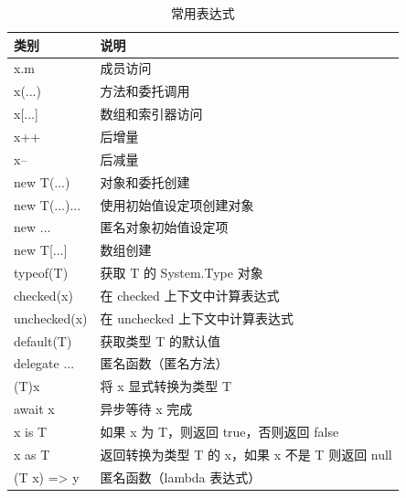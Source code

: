 \begin{table}[htbp]
    \centering
    \caption{常用表达式}
    \label{tab:expression}
    \begin{tabular}{l|l}
        \hline
        类别              & 说明                               \\
        \hline
        x.m             & 成员访问                             \\
        x(...)          & 方法和委托调用                          \\
        x[...]          & 数组和索引器访问                         \\
        x++             & 后增量                              \\
        x--             & 后减量                              \\
        new T(...)      & 对象和委托创建                          \\
        new T(...){...} & 使用初始值设定项创建对象                     \\
        new {...}       & 匿名对象初始值设定项                       \\
        new T[...]      & 数组创建                             \\
        typeof(T)       & 获取 T 的 System.Type 对象            \\
        checked(x)      & 在 checked 上下文中计算表达式              \\
        unchecked(x)    & 在 unchecked 上下文中计算表达式            \\
        default(T)      & 获取类型 T 的默认值                      \\
        delegate {...}  & 匿名函数（匿名方法）                       \\
        (T)x            & 将 x 显式转换为类型 T                    \\
        await x         & 异步等待 x 完成                        \\
        x is T          & 如果 x 为 T，则返回 true，否则返回 false     \\
        x as T          & 返回转换为类型 T 的 x，如果 x 不是 T 则返回 null \\
        (T x) => y      & 匿名函数（lambda 表达式）                 \\
        \hline
    \end{tabular}
\end{table}

